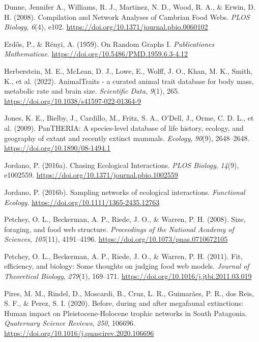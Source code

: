 \documentclass[
]{agujournal2019}
\newlength{\cslhangindent}
\newenvironment{CSLReferences}[2] %
 {\begin{list}{}{%
  \setlength{\itemindent}{0pt}
  \setlength{\leftmargin}{0pt}
  \setlength{\parsep}{0pt}
  \ifodd #1
   \setlength{\leftmargin}{\cslhangindent}
   \setlength{\itemindent}{-1\cslhangindent}
  \fi
  \setlength{\itemsep}{#2\baselineskip}}}
 {\end{list}}
\begin{document}
\begin{CSLReferences}{1}{0}
Dunne, Jennifer A., Williams, R. J., Martinez, N. D., Wood, R. A., \&
Erwin, D. H. (2008). Compilation and {Network Analyses} of {Cambrian
Food Webs}. \emph{PLOS Biology}, \emph{6}(4), e102.
\url{https://doi.org/10.1371/journal.pbio.0060102}

Erdős, P., \& Rényi, A. (1959). On {Random Graphs I}.
\emph{Publicationes Mathematicae}.
\url{https://doi.org/10.5486/PMD.1959.6.3-4.12}

Herberstein, M. E., McLean, D. J., Lowe, E., Wolff, J. O., Khan, M. K.,
Smith, K., et al. (2022). {AnimalTraits} - a curated animal trait
database for body mass, metabolic rate and brain size. \emph{Scientific
Data}, \emph{9}(1), 265.
\url{https://doi.org/10.1038/s41597-022-01364-9}

Jones, K. E., Bielby, J., Cardillo, M., Fritz, S. A., O'Dell, J., Orme,
C. D. L., et al. (2009). {PanTHERIA}: A species-level database of life
history, ecology, and geography of extant and recently extinct mammals.
\emph{Ecology}, \emph{90}(9), 2648--2648.
\url{https://doi.org/10.1890/08-1494.1}

Jordano, P. (2016a). Chasing {Ecological Interactions}. \emph{PLOS
Biology}, \emph{14}(9), e1002559.
\url{https://doi.org/10.1371/journal.pbio.1002559}

Jordano, P. (2016b). Sampling networks of ecological interactions.
\emph{Functional Ecology}. \url{https://doi.org/10.1111/1365-2435.12763}

Petchey, O. L., Beckerman, A. P., Riede, J. O., \& Warren, P. H. (2008).
Size, foraging, and food web structure. \emph{Proceedings of the
National Academy of Sciences}, \emph{105}(11), 4191--4196.
\url{https://doi.org/10.1073/pnas.0710672105}

Petchey, O. L., Beckerman, A. P., Riede, J. O., \& Warren, P. H. (2011).
Fit, efficiency, and biology: {Some} thoughts on judging food web
models. \emph{Journal of Theoretical Biology}, \emph{279}(1), 169--171.
\url{https://doi.org/10.1016/j.jtbi.2011.03.019}

Pires, M. M., Rindel, D., Moscardi, B., Cruz, L. R., Guimarães, P. R.,
dos Reis, S. F., \& Perez, S. I. (2020). Before, during and after
megafaunal extinctions: {Human} impact on {Pleistocene-Holocene} trophic
networks in {South Patagonia}. \emph{Quaternary Science Reviews},
\emph{250}, 106696.
\url{https://doi.org/10.1016/j.quascirev.2020.106696}


\end{CSLReferences}
\end{document}
